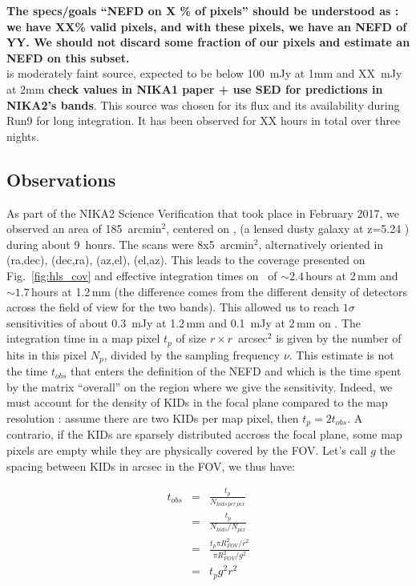 {\bf The specs/goals ``NEFD on X \% of pixels'' should be understood as : we have
XX\% valid pixels, and with these pixels, we have an NEFD of YY. We should not
discard some fraction of our pixels and estimate an NEFD on this subset.}\\

\hls is moderately faint source, expected to be below 100~mJy at 1mm and
XX~mJy at 2mm {\bf check values in NIKA1 paper + use SED for predictions in
  NIKA2's bands}. This source was chosen for its flux and its availability during
Run9 for long integration. It has been observed for XX hours in total over three
nights.


\subsection{Observations}

As part of the NIKA2 Science Verification that took place in February 2017, we
observed an area of 185~arcmin$^2$, centered on \hls, (a lensed dusty galaxy at
z=5.24 \cite{combes2012}) during about 9~hours. The scans were 8x5~arcmin$^2$,
alternatively oriented in (ra,dec), (dec,ra), (az,el), (el,az). This leads to
the coverage presented on Fig.~\ref{fig:hls_cov} and effective integration times
on \hls\ of $\sim 2.4$\,hours at 2\,mm and $\sim 1.7$\,hours at 1.2\,mm (the
difference comes from the different density of detectors across the field of
view for the two bands). This allowed us to reach $1\sigma$ sensitivities of
about 0.3~mJy at 1.2\,mm and 0.1~mJy at 2\,mm on \hls. The integration time in a
map pixel $t_p$ of size $r\times r$~arcsec$^2$ is given by the number of hits in
this pixel $N_p$, divided by the sampling frequency $\nu$. This estimate is not
the time $t_{obs}$ that enters the definition of the NEFD and which is the time
spent by the matrix ``overall'' on the region where we give the
sensitivity. Indeed, we must account for the density of KIDs in the focal plane
compared to the map resolution : assume there are two KIDs per map pixel, then
$t_p = 2 t_{obs}$. A contrario, if the KIDs are sparsely distributed accross the
focal plane, some map pixels are empty while they are physically covered by the
FOV. Let's call $g$ the spacing between KIDs in arcsec in the FOV, we thus have:

\begin{eqnarray}
t_{obs} &=& \frac{t_p}{N_{kids\,per\,pix}} \nonumber\\
&=& \frac{t_p}{N_{kids}/N_{pix}} \nonumber\\
&=& \frac{t_p\pi R_{FOV}^2/r^2}{\pi R_{FOV}^2/g^2} \nonumber\\
&=&t_p g^2r^2
\end{eqnarray}

